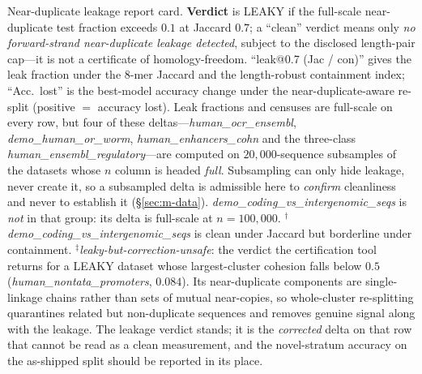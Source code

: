 \documentclass[webpdf,modern,large,namedate]{oup-authoring-template}%
\begin{document}
\begin{table}[tbp]
\begin{center}
\begin{minipage}{\textwidth}
\caption{Near-duplicate leakage report card. \textbf{Verdict} is LEAKY if the full-scale near-duplicate test fraction exceeds $0.1$ at Jaccard $0.7$; a ``clean'' verdict means only \emph{no forward-strand near-duplicate leakage detected}, subject to the disclosed length-pair cap---it is not a certificate of homology-freedom. ``leak@0.7 (Jac / con)'' gives the leak fraction under the $8$-mer Jaccard and the length-robust containment index; ``Acc.\ lost'' is the best-model accuracy change under the near-duplicate-aware re-split (positive $=$ accuracy lost). Leak fractions and censuses are full-scale on every row, but four of these deltas---\textit{human\_ocr\_ensembl}, \textit{demo\_human\_or\_worm}, \textit{human\_enhancers\_cohn} and the three-class \textit{human\_ensembl\_regulatory}---are computed on $20{,}000$-sequence subsamples of the datasets whose $n$ column is headed \emph{full}. Subsampling can only hide leakage, never create it, so a subsampled delta is admissible here to \emph{confirm} cleanliness and never to establish it (\S\ref{sec:m-data}). \textit{demo\_coding\_vs\_intergenomic\_seqs} is \emph{not} in that group: its delta is full-scale at $n=100{,}000$. $^{\dagger}$\textit{demo\_coding\_vs\_intergenomic\_seqs} is clean under Jaccard but borderline under containment. $^{\ddagger}$\emph{leaky-but-correction-unsafe}: the verdict the certification tool returns for a LEAKY dataset whose largest-cluster cohesion falls below $0.5$ (\textit{human\_nontata\_promoters}, $0.084$). Its near-duplicate components are single-linkage chains rather than sets of mutual near-copies, so whole-cluster re-splitting quarantines related but non-duplicate sequences and removes genuine signal along with the leakage. The leakage verdict stands; it is the \emph{corrected} delta on that row that cannot be read as a clean measurement, and the novel-stratum accuracy on the as-shipped split should be reported in its place.\label{tab:reportcard}}
\resizebox{\textwidth}{!}{}
\end{minipage}
\end{center}
\end{table}
\end{document}
